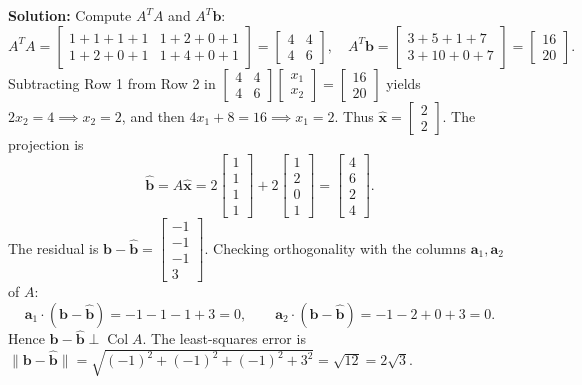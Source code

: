 \documentclass[11pt, letterpaper]{article}
\theoremstyle{definition}
\theoremstyle{remark}
\begin{document}
\textbf{Solution:} Compute $A^T A$ and $A^T \mathbf{b}$:
\[
A^T A = \begin{bmatrix} 1+1+1+1 & 1+2+0+1 \\ 1+2+0+1 & 1+4+0+1 \end{bmatrix} = \begin{bmatrix} 4 & 4 \\ 4 & 6 \end{bmatrix}, \quad A^T \mathbf{b} = \begin{bmatrix} 3+5+1+7 \\ 3+10+0+7 \end{bmatrix} = \begin{bmatrix} 16 \\ 20 \end{bmatrix}.
\]
Subtracting Row 1 from Row 2 in $\begin{bmatrix} 4 & 4 \\ 4 & 6 \end{bmatrix} \begin{bmatrix} x_1 \\ x_2 \end{bmatrix} = \begin{bmatrix} 16 \\ 20 \end{bmatrix}$ yields $2x_2 = 4 \implies x_2 = 2$, and then $4x_1 + 8 = 16 \implies x_1 = 2$. Thus $\hat{\mathbf{x}} = \begin{bmatrix} 2 \\ 2 \end{bmatrix}$. The projection is
\[
\hat{\mathbf{b}} = A\hat{\mathbf{x}} = 2\begin{bmatrix} 1 \\ 1 \\ 1 \\ 1 \end{bmatrix} + 2\begin{bmatrix} 1 \\ 2 \\ 0 \\ 1 \end{bmatrix} = \begin{bmatrix} 4 \\ 6 \\ 2 \\ 4 \end{bmatrix}.
\]
The residual is $\mathbf{b} - \hat{\mathbf{b}} = \begin{bmatrix} -1 \\ -1 \\ -1 \\ 3 \end{bmatrix}$. Checking orthogonality with the columns $\mathbf{a}_1, \mathbf{a}_2$ of $A$:
\[
\mathbf{a}_1 \cdot (\mathbf{b} - \hat{\mathbf{b}}) = -1 - 1 - 1 + 3 = 0, \qquad \mathbf{a}_2 \cdot (\mathbf{b} - \hat{\mathbf{b}}) = -1 - 2 + 0 + 3 = 0.
\]
Hence $\mathbf{b} - \hat{\mathbf{b}} \perp \operatorname{Col} A$. The least-squares error is $\|\mathbf{b} - \hat{\mathbf{b}}\| = \sqrt{(-1)^2 + (-1)^2 + (-1)^2 + 3^2} = \sqrt{12} = 2\sqrt{3}$.
\end{document}
